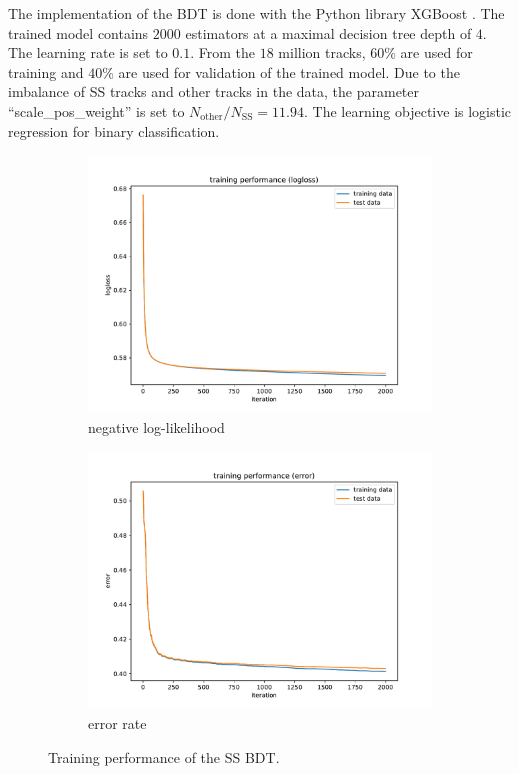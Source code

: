 The implementation of the BDT is done with the Python library XGBoost \cite{xgboost}.
The trained model contains $2000$ estimators at a maximal decision tree depth of $4$.
The learning rate is set to $0.1$.
From the $18$ million tracks, $60\%$ are used for training and $40\%$ are used for validation of the trained model.
Due to the imbalance of SS tracks and other tracks in the data, the parameter \enquote{scale\_pos\_weight} is set to $N_\text{other}/N_\text{SS} = 11.94$.
The learning objective is logistic regression for binary classification.

\begin{figure}
    \centering
    \begin{subfigure}{0.5\textwidth}
        \centering
        \includegraphics[width=\textwidth]{images/SS_history_logloss.pdf}
        \caption{negative log-likelihood}
    \end{subfigure}%
    \begin{subfigure}{0.5\textwidth}
        \centering
        \includegraphics[width=\textwidth]{images/SS_history_error.pdf}
        \caption{error rate}
    \end{subfigure}%
    \caption{Training performance of the SS BDT.}
    \label{fig:SS_history}
\end{figure}

